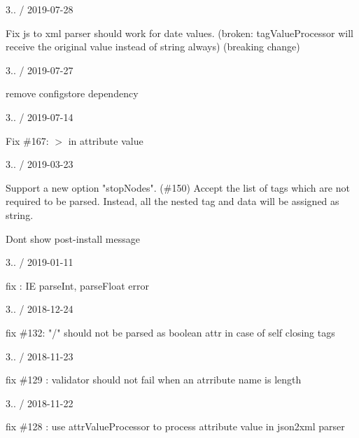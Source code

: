 3.. / 2019-\/07-\/28
\begin{DoxyItemize}
\item Fix js to xml parser should work for date values. (broken\+: {\ttfamily tag\+Value\+Processor} will receive the original value instead of string always) (breaking change)
\end{DoxyItemize}

3.. / 2019-\/07-\/27
\begin{DoxyItemize}
\item remove configstore dependency
\end{DoxyItemize}

3.. / 2019-\/07-\/14
\begin{DoxyItemize}
\item Fix \#167\+: \textquotesingle{}\texorpdfstring{$>$}{>}\textquotesingle{} in attribute value
\end{DoxyItemize}

3.. / 2019-\/03-\/23
\begin{DoxyItemize}
\item Support a new option "{}stop\+Nodes"{}. (\#150) Accept the list of tags which are not required to be parsed. Instead, all the nested tag and data will be assigned as string.
\item Don\textquotesingle{}t show post-\/install message
\end{DoxyItemize}

3.. / 2019-\/01-\/11
\begin{DoxyItemize}
\item fix \+: IE parse\+Int, parse\+Float error
\end{DoxyItemize}

3.. / 2018-\/12-\/24
\begin{DoxyItemize}
\item fix \#132\+: "{}/"{} should not be parsed as boolean attr in case of self closing tags
\end{DoxyItemize}

3.. / 2018-\/11-\/23
\begin{DoxyItemize}
\item fix \#129 \+: validator should not fail when an atrribute name is \textquotesingle{}length\textquotesingle{}
\end{DoxyItemize}

3.. / 2018-\/11-\/22
\begin{DoxyItemize}
\item fix \#128 \+: use \textquotesingle{}attr\+Value\+Processor\textquotesingle{} to process attribute value in json2xml parser
\end{DoxyItemize}

